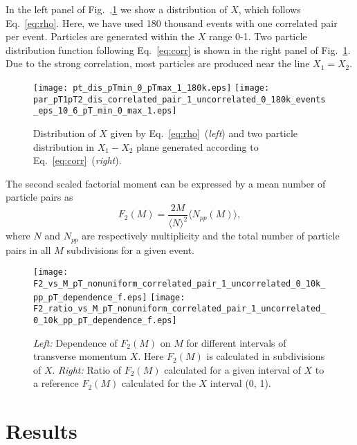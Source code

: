 \documentclass[floatfix,superscriptaddress,a4paper,
               nofootinbib,preprint]{revtex4}
\begin{document}
In the left panel of Fig.~,\ref{fig:X_dis} we show a distribution of $X$, which follows Eq.~\ref{eq:rho}. Here, we have used 180 thousand events with one correlated pair per event. Particles are generated within the $X$ range 0-1. Two particle distribution function following Eq.~\ref{eq:corr} is shown in the right panel of Fig.~\ref{fig:X_dis}. Due to the strong correlation, most particles are produced near the line $X_1 = X_2$.

\begin{figure}
\centering 
 \begin{center}
\texttt{[image: pt\_dis\_pTmin\_0\_pTmax\_1\_180k.eps]}
\texttt{[image: par\_pT1pT2\_dis\_correlated\_pair\_1\_uncorrelated\_0\_180k\_events\_eps\_10\_6\_pT\_min\_0\_max\_1.eps]}
\end{center}
\caption{
Distribution of $X$ given by Eq.~\ref{eq:rho}~(\textit{left}) and two particle  distribution in $X_1 - X_2$ plane generated according to Eq.~\ref{eq:corr}~(\textit{right}).}
\label{fig:X_dis}
\end{figure}

The 
second scaled factorial moment can be expressed by a mean number of particle pairs as 
\begin{equation}
F_2 (M) = \frac{2M}{ \langle N \rangle^2 } \langle N_{pp}(M) \rangle,
\end{equation}
where $N$ and $N_{pp}$ are respectively multiplicity and the total number of particle pairs in all
$M$ subdivisions for a given event.


\begin{figure}
\centering
\begin{center}
\texttt{[image: F2\_vs\_M\_pT\_nonuniform\_correlated\_pair\_1\_uncorrelated\_0\_10k\_pp\_pT\_dependence\_f.eps]}
\texttt{[image: F2\_ratio\_vs\_M\_pT\_nonuniform\_correlated\_pair\_1\_uncorrelated\_0\_10k\_pp\_pT\_dependence\_f.eps]}
\end{center}
\caption{\textit{Left:} Dependence of $F_2(M)$ on $M$ for different intervals of transverse momentum $X$. Here $F_2(M)$ is calculated in subdivisions of $X$. \textit{Right:} Ratio of $F_2(M)$ calculated for a given interval of $X$ to a reference $F_2(M)$ calculated for the $X$ interval (0, 1).}
\label{fig:F2_nonuniform}
\end{figure}

\section{Results}\label{sec:results}
\end{document}
